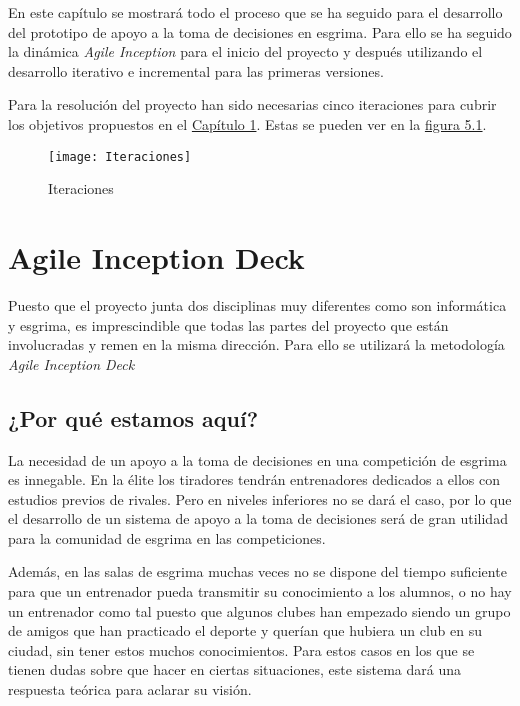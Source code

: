 En este capítulo se mostrará todo el proceso que se ha seguido para el desarrollo del prototipo
de apoyo a la toma de decisiones en esgrima. Para ello se ha seguido la dinámica \textit{Agile Inception}
para el inicio del proyecto y después utilizando el desarrollo iterativo e incremental para
las primeras versiones.

Para la resolución del proyecto han sido necesarias cinco iteraciones para cubrir
los objetivos propuestos en el \hyperref[cap: Introducción y objetivos]{Capítulo 1}. Estas se pueden ver en la \hyperref[fig:Iteraciones]{figura 5.1}.

\begin{figure}[htb]
  \centering
    \texttt{[image: Iteraciones]}
  \caption[Iteraciones]{Iteraciones}
  \label{fig:Iteraciones}
\end{figure}

\section{Agile Inception Deck}

Puesto que el proyecto junta dos disciplinas muy diferentes como son informática y esgrima,
es imprescindible que todas las partes del proyecto que están involucradas y remen en la misma
dirección. Para ello se utilizará la metodología \textit{Agile Inception Deck}

\subsection{¿Por qué estamos aquí?}
La necesidad de un apoyo a la toma de decisiones en una competición de esgrima es innegable.
En la élite los tiradores tendrán entrenadores dedicados a ellos con estudios previos de rivales.
Pero en niveles inferiores no se dará el caso, por lo que el desarrollo de un sistema de
apoyo a la toma de decisiones será de gran utilidad para la comunidad de esgrima en las
competiciones.

Además, en las salas de esgrima muchas veces no se dispone del tiempo suficiente para que un
entrenador pueda transmitir su conocimiento a los alumnos, o no hay un entrenador como tal
puesto que algunos clubes han empezado siendo un grupo de amigos que han practicado el deporte
y querían que hubiera un club en su ciudad, sin tener estos muchos conocimientos. Para estos
casos en los que se tienen dudas sobre que hacer en ciertas situaciones, este sistema
dará una respuesta teórica para aclarar su visión.

